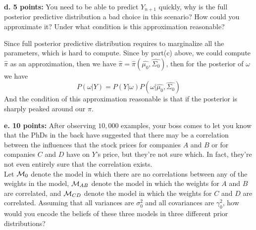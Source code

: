 \documentclass[letterpaper,10pt]{article}
\newcommand{\Mc}{{\cal M}}
\begin{document}
\begin{framed}
\textbf{d. 5 points:} You need to be able to predict $Y_{n+1}$ quickly, why is the full posterior predictive distribution a bad choice in this scenario? How could you approximate it? Under what condition is this approximation reasonable?
\end{framed}

Since full posterior predictive distribution requires to marginalize all the parameters, which is hard to compute. Since by part(c) above, we could compute $\hat{\pi}$ as an approximation, then we have $\hat{\pi} = \hat{\pi}(\hat{\mu_0},\hat{\Sigma_0} )$, then for the posterior of $\omega$ we have
$$
P(\omega | Y ) = P(Y| \omega ) P(\omega| \hat{\mu_0},\hat{\Sigma_0})
$$
And the condition of this approximation reasonable is that if the posterior is sharply peaked around our $\hat{\pi}$.

\begin{framed}
\textbf{e. 10 points:} After observing $10,000$ examples, your boss comes to let you know that the PhDs in the back have suggested that there may be a correlation between the influences that the stock prices for companies $A$ and $B$ or for companies $C$ and $D$ have on $Y$'s price, but they're not sure which. In fact, they're not even entirely sure that the correlation exists.\\
Let $\Mc_0$ denote the model in which there are no correlations between any of the weights in the model, $\Mc_{AB}$ denote the model in which the weights for $A$ and $B$ are correlated, and $\Mc_{CD}$ denote the model in which the weights for $C$ and $D$ are correlated. Assuming that all variances are $\sigma_0^2$ and all covariances are $\gamma_0^2$, how would you encode the beliefs of these three models in three different prior distributions?
\end{framed}
\end{document}
